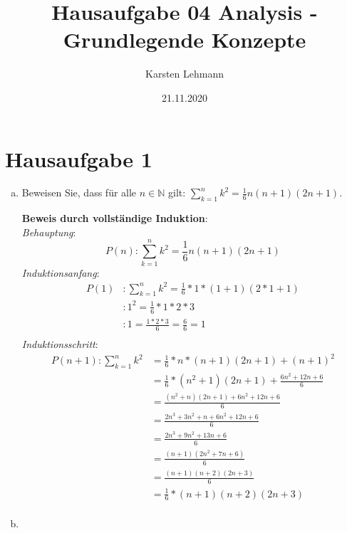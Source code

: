 \documentclass{article}
\author{Karsten Lehmann}
\date{21.11.2020}
\title{Hausaufgabe 04 Analysis - Grundlegende Konzepte}
\begin{document}
\maketitle
\newpage

\section*{Hausaufgabe 1}

\begin{enumerate}[a)]
\item Beweisen Sie, dass für alle $n \in \mathbb{N}$ gilt:
  $\sum\limits_{k = 1}^n k^2 = \frac{1}{6} n (n + 1) (2n + 1)$.

  \textbf{Beweis durch vollständige Induktion}: \\
  \emph{Behauptung}:
  \[
    P(n) \colon \sum\limits_{k = 1}^n k^2 = \frac{1}{6} n (n + 1) (2n + 1)
  \]
  \emph{Induktionsanfang}:
  \begin{align*}
    P(1) &\colon \sum\limits_{k = 1}^n k^2 = \frac{1}{6} * 1 * (1 + 1) (2 * 1 + 1) \\
         &\colon 1^2 = \frac{1}{6} * 1 * 2 * 3 \\
         &\colon 1 = \frac{1 * 2 * 3}{6} = \frac{6}{6} = 1 \\
  \end{align*}
  \emph{Induktionsschritt}:
  \begin{align*}
    P(n + 1) \colon \sum\limits_{k = 1}^n k^2 &= \frac{1}{6} * n * (n + 1) (2n + 1) + (n + 1)^2 \\
                                              &= \frac{1}{6} * (n^2 + 1) (2n + 1) + \frac{6n^2 + 12n + 6}{6} \\
                                              &= \frac{(n^2 + n) (2n + 1) + 6n^2 + 12n + 6}{6} \\
                                              &= \frac{2n^3  + 3n^2 + n + 6n^2 + 12n + 6}{6} \\
                                              &= \frac{2n^3 + 9n^2 + 13n + 6}{6} \\
                                              &= \frac{(n + 1)(2n^2 + 7n + 6)}{6} \\
                                              &= \frac{(n + 1)(n + 2)(2n + 3)}{6} \\
                                              &= \frac{1}{6} * (n + 1) (n + 2) (2n + 3)\\
  \end{align*}
\item

\end{enumerate}
\end{document}
